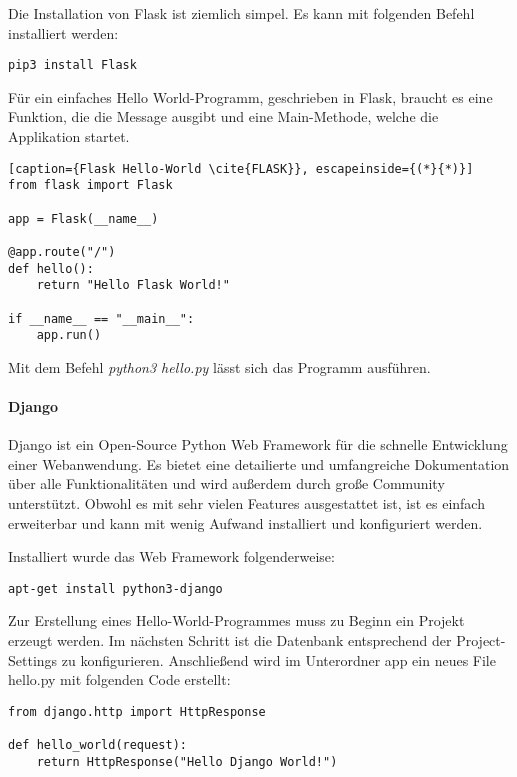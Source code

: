 Die Installation von Flask ist ziemlich simpel. Es kann mit folgenden Befehl installiert werden:
\begin{lstlisting}[caption={Installation von Flask \cite{FLASK}}]
pip3 install Flask
\end{lstlisting}

Für ein einfaches \grqq{}Hello World\grqq{}-Programm, geschrieben in Flask, braucht es eine Funktion, die die Message ausgibt und eine Main-Methode, welche die Applikation startet.

\begin{lstlisting}[caption={Flask Hello-World \cite{FLASK}}, escapeinside={(*}{*)}]
from flask import Flask

app = Flask(__name__)

@app.route("/")
def hello():
	return "Hello Flask World!"

if __name__ == "__main__":
    app.run()
\end{lstlisting}

Mit dem Befehl \textit{python3 hello.py} lässt sich das Programm ausführen.

\paragraph{Django}
Django ist ein Open-Source Python Web Framework für die schnelle Entwicklung einer Webanwendung. Es bietet eine detailierte und umfangreiche Dokumentation über alle Funktionalitäten und wird außerdem durch große Community unterstützt. Obwohl es mit sehr vielen Features ausgestattet ist, ist es einfach erweiterbar und kann mit wenig Aufwand installiert und konfiguriert werden.\cite{DJANGO}

Installiert wurde das Web Framework folgenderweise:
\begin{lstlisting}[caption={Installation von Django\cite{DJANGOIN}}]
apt-get install python3-django
\end{lstlisting}

Zur Erstellung eines \grqq{}Hello-World\grqq{}-Programmes muss zu Beginn ein Projekt erzeugt werden. Im nächsten Schritt ist die Datenbank entsprechend der Project-Settings zu konfigurieren. Anschließend wird im Unterordner app ein neues File \grqq{}hello.py\grqq{} mit folgenden Code erstellt:

\begin{lstlisting}[caption={Django Hello-World \cite{DJANGOCODE}}]
from django.http import HttpResponse

def hello_world(request):
	return HttpResponse("Hello Django World!")
\end{lstlisting}

